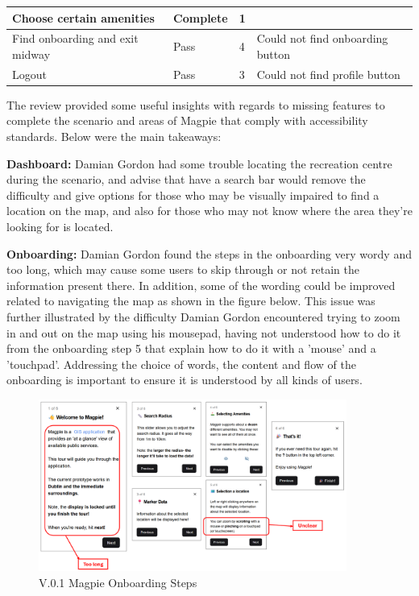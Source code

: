 \begin{table}[h!]
\begin{tabular}{|p{}|p{}|p{}|p{}|}
        \hline
        Choose certain amenities         & Complete        & 1                   &                                                                                   \\
        \hline
        Find onboarding and exit midway  & Pass            & 4                   & Could not find onboarding button                                                  \\
        \hline
        Logout                           & Pass            & 3                   & Could not find profile button                                                     \\
        \hline
    \end{tabular}
\end{table}

\newpage{}

The review provided some useful insights with regards to missing
features to complete the scenario and areas of Magpie that comply with
accessibility standards. Below were the main takeaways:

\textbf{Dashboard: }
Damian Gordon had some trouble locating the recreation centre during the
scenario, and advise that have a search bar would remove the difficulty and give
options for those who may be visually impaired to find a location on the map,
and also for those who may not know where the area they're looking for is
located.

\textbf{Onboarding: }
Damian Gordon found the steps in the onboarding very wordy and too long, which
may cause some users to skip through or not retain the information present
there. In addition, some of the wording could be improved related to navigating
the map as shown in the figure below. This issue was further illustrated by the
difficulty Damian Gordon encountered trying to zoom in and out on the map using
his mousepad, having not understood how to do it from the onboarding step 5 that
explain how to do it with a 'mouse' and a 'touchpad'. Addressing the choice of
words, the content and flow of the onboarding is important to ensure it is
understood by all kinds of users.

\begin{figure}[h!]
    \centering
    \includegraphics[width=0.9\textwidth]{images/onboarding-text-v1.png}
    \caption{V.0.1 Magpie Onboarding Steps}
\end{figure}

